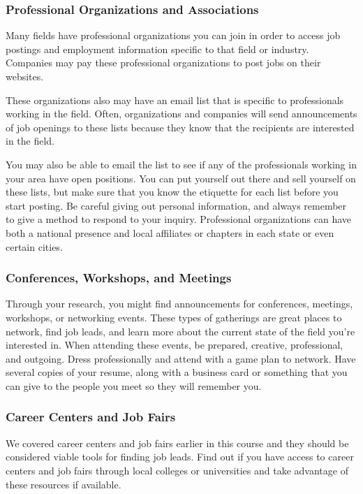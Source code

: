\subsubsection*{Professional Organizations and Associations}

Many fields have professional organizations you can join in order to access job postings and employment information specific to that field or industry. Companies may pay these professional organizations to post jobs on their websites.

These organizations also may have an email list that is specific to professionals working in the field. Often, organizations and companies will send announcements of job openings to these lists because they know that the recipients are interested in the field.

You may also be able to email the list to see if any of the professionals working in your area have open positions. You can put yourself out there and sell yourself on these lists, but make sure that you know the etiquette for each list before you start posting. Be careful giving out personal information, and always remember to give a method to respond to your inquiry. Professional organizations can have both a national presence and local affiliates or chapters in each state or even certain cities.

\subsubsection*{Conferences, Workshops, and Meetings}

Through your research, you might find announcements for conferences, meetings, workshops, or networking events. These types of gatherings are great places to network, find job leads, and learn more about the current state of the field you're interested in. When attending these events, be prepared, creative, professional, and outgoing. Dress professionally and attend with a game plan to network. Have several copies of your resume, along with a business card or something that you can give to the people you meet so they will remember you.

\subsubsection*{Career Centers and Job Fairs}

We covered career centers and job fairs earlier in this course and they should be considered viable tools for finding job leads. Find out if you have access to career centers and job fairs through local colleges or universities and take advantage of these resources if available.

